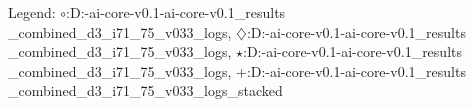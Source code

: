 Legend: {\color{CornflowerBlue}$\circ$}:D:\engineering-ai-core-v0.1\engineering-ai-core-v0.1\exdata\validation\_results\\_combined\_d3\_i71\_75\_v033\coco\_logs\cmaes, {{}$\diamondsuit$}:D:\engineering-ai-core-v0.1\engineering-ai-core-v0.1\exdata\validation\_results\\_combined\_d3\_i71\_75\_v033\coco\_logs\ngopt, {\color{Green}$\star$}:D:\engineering-ai-core-v0.1\engineering-ai-core-v0.1\exdata\validation\_results\\_combined\_d3\_i71\_75\_v033\coco\_logs\stacked, {\color{red}+}:D:\engineering-ai-core-v0.1\engineering-ai-core-v0.1\exdata\validation\_results\\_combined\_d3\_i71\_75\_v033\coco\_logs\adaptive\_stacked